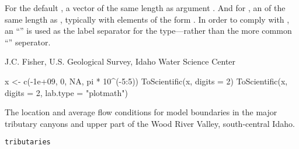 \documentclass[a4paper]{book}
\begin{document}
%
\begin{Value}
For the default , a  vector of the same length as argument .
And for , an  of the same length as , typically with elements of the form .
In order to comply with ,
an ``'' is used as the label separator for the  type---rather than the more common ``\code{\%*\%}'' seperator.
\end{Value}
%
\begin{Author}\relax
J.C. Fisher, U.S. Geological Survey, Idaho Water Science Center
\end{Author}
%
\begin{Examples}
\begin{ExampleCode}
x <- c(-1e+09, 0, NA, pi * 10^(-5:5))
ToScientific(x, digits = 2)
ToScientific(x, digits = 2, lab.type = "plotmath")
\end{ExampleCode}
\end{Examples}
%
\begin{Description}\relax
The location and average flow conditions for model boundaries in the major tributary canyons and upper part of the Wood River Valley, south-central Idaho.
\end{Description}
%
\begin{Usage}
\begin{verbatim}
tributaries
\end{verbatim}
\end{Usage}
%
\end{document}

